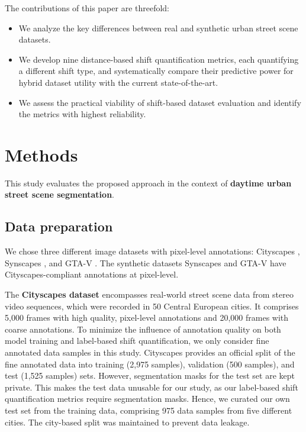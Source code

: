 \documentclass[conference]{IEEEtran}
\begin{document}
The contributions of this paper are threefold: 
\begin{itemize}
\item We analyze the key differences between real and synthetic urban street scene datasets.
\item We develop nine distance-based shift quantification metrics, each quantifying a different shift type, and systematically compare their predictive power for hybrid dataset utility with the current state-of-the-art.
\item We assess the practical viability of shift-based dataset evaluation and identify the metrics with highest reliability.
\end{itemize}

\section{Methods}
This study evaluates the proposed approach in the context of \textbf{daytime urban street scene segmentation}.

\subsection{Data preparation}
\label{sec:datasetPreparation}






We chose three different image datasets with pixel-level annotations: Cityscapes \cite{cityscapes}, Synscapes \cite{synscapes}, and GTA-V \cite{GTA_V}. The synthetic datasets Synscapes and GTA-V have Cityscapes-compliant annotations at pixel-level. 

The \textbf{Cityscapes dataset} \cite{cityscapes} encompasses real-world street scene data from stereo video sequences, which were recorded in 50 Central European cities. It comprises 5,000 frames with high quality, pixel-level annotations and 20,000 frames with coarse annotations. To minimize the influence of annotation quality on both model training and label-based shift quantification, we only consider fine annotated data samples in this study. Cityscapes provides an official split of the fine annotated data into training (2,975 samples), validation (500 samples), and test (1,525 samples) sets. However, segmentation masks for the test set are kept private. This makes the test data unusable for our study, as our label-based shift quantification metrics require segmentation masks. Hence, we curated our own test set from the training data, comprising 975 data samples from five different cities. The city-based split was maintained to prevent data leakage.
\end{document}
